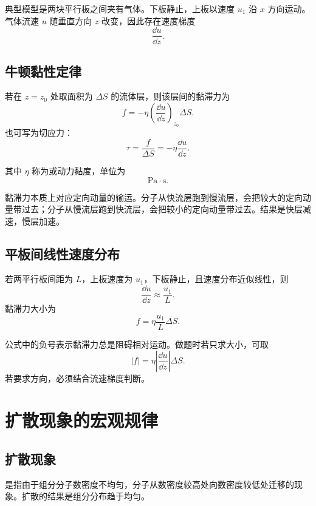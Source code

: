典型模型是两块平行板之间夹有气体。下板静止，上板以速度 \(u_1\) 沿 \(x\) 方向运动。气体流速 \(u\) 随垂直方向 \(z\) 改变，因此存在速度梯度
\[
  \frac{\dd u}{\dd z}.
\]

\subsection{牛顿黏性定律}

\begin{FormulaBox}[牛顿黏性定律]
若在 \(z=z_0\) 处取面积为 \(\Delta S\) 的流体层，则该层间的黏滞力为
\[
  \boxed{
  f
  =
  -\eta
  \left(\frac{\dd u}{\dd z}\right)_{z_0}
  \Delta S
  }.
\]
也可写为切应力：
\[
  \boxed{
  \tau
  =
  \frac{f}{\Delta S}
  =
  -\eta\frac{\dd u}{\dd z}
  }.
\]
\end{FormulaBox}

其中 \(\eta\) 称为或动力黏度，单位为
\[
  \mathrm{Pa\cdot s}.
\]

\begin{KeyBox}[黏滞的物理含义]
黏滞力本质上对应定向动量的输运。分子从快流层跑到慢流层，会把较大的定向动量带过去；分子从慢流层跑到快流层，会把较小的定向动量带过去。结果是快层减速，慢层加速。
\end{KeyBox}

\subsection{平板间线性速度分布}

若两平行板间距为 \(L\)，上板速度为 \(u_1\)，下板静止，且速度分布近似线性，则
\[
  \frac{\dd u}{\dd z}\approx \frac{u_1}{L}.
\]
黏滞力大小为
\[
  \boxed{
  f
  =
  \eta\frac{u_1}{L}\Delta S
  }.
\]

\begin{WarnBox}[黏滞力的方向]
公式中的负号表示黏滞力总是阻碍相对运动。做题时若只求大小，可取
\[
  |f|=\eta\left|\frac{\dd u}{\dd z}\right|\Delta S.
\]
若要求方向，必须结合流速梯度判断。
\end{WarnBox}

\section{扩散现象的宏观规律}

\subsection{扩散现象}

是指由于组分分子数密度不均匀，分子从数密度较高处向数密度较低处迁移的现象。扩散的结果是组分分布趋于均匀。

